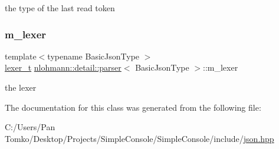 the type of the last read token 

\mbox{\label{classnlohmann_1_1detail_1_1parser_a22dcc815551a4052b87797b34171b352}} 
\subsubsection{\texorpdfstring{m\_lexer}{m\_lexer}}
{\footnotesize\ttfamily template$<$typename Basic\+Json\+Type $>$ \\
\mbox{\hyperlink{classnlohmann_1_1detail_1_1parser_a16030c5af158a94d1c799f82ff3a0147}{lexer\+\_\+t}} \mbox{\hyperlink{classnlohmann_1_1detail_1_1parser}{nlohmann\+::detail\+::parser}}$<$ Basic\+Json\+Type $>$\+::m\+\_\+lexer\hspace{0.3cm}{\ttfamily [private]}}



the lexer 



The documentation for this class was generated from the following file\+:\begin{DoxyCompactItemize}
\item 
C\+:/\+Users/\+Pan Tomko/\+Desktop/\+Projects/\+Simple\+Console/\+Simple\+Console/include/\mbox{\hyperlink{json_8hpp}{json.\+hpp}}\end{DoxyCompactItemize}
